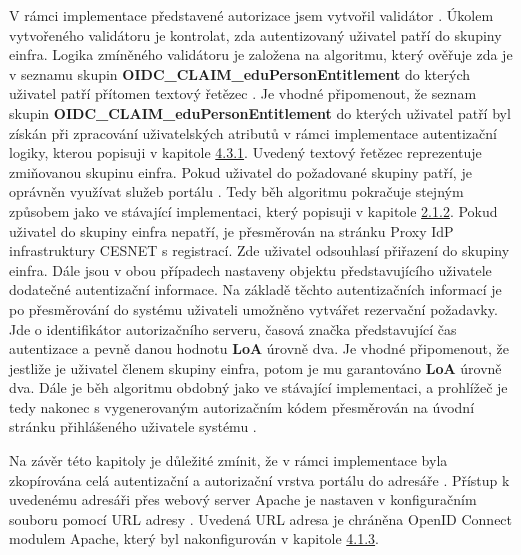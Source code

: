 \documentclass[
  printed, %
  twoside, %
  table,   %
  nolof,     %
  nolot,     %
]{fithesis3}
\begin{document}
V rámci implementace představené autorizace jsem vytvořil validátor . Úkolem vytvořeného validátoru  je kontrolat, zda autentizovaný uživatel patří do skupiny einfra. Logika zmíněného validátoru je založena na algoritmu, který ověřuje zda je v seznamu skupin \textbf{OIDC\_CLAIM\_eduPersonEntitlement} do kterých uživatel patří přítomen textový řetězec . Je vhodné připomenout, že seznam skupin \textbf{OIDC\_CLAIM\_eduPersonEntitlement} do kterých uživatel patří byl získán při zpracování uživatelských atributů v rámci implementace autentizační logiky, kterou popisuji v kapitole \hyperref[ShongoImpl-authn]{4.3.1}. Uvedený textový řetězec reprezentuje zmiňovanou skupinu einfra. Pokud uživatel do požadované skupiny patří, je oprávněn využívat služeb portálu . Tedy běh algoritmu pokračuje stejným způsobem jako ve stávající implementaci, který popisuji v kapitole \hyperref[meetings-old]{2.1.2}. Pokud uživatel do skupiny einfra nepatří, je přesměrován na stránku Proxy IdP infrastruktury CESNET s registrací. Zde uživatel odsouhlasí přiřazení do skupiny einfra. Dále jsou v obou případech nastaveny objektu představujícího uživatele dodatečné autentizační informace. Na základě těchto autentizačních informací je po přesměrování do systému  uživateli umožněno vytvářet rezervační požadavky. Jde o identifikátor autorizačního serveru, časová značka představující čas autentizace a pevně danou hodnotu \textbf{LoA} úrovně dva. Je vhodné připomenout, že jestliže je uživatel členem skupiny einfra, potom je mu garantováno \textbf{LoA} úrovně dva. Dále je běh algoritmu obdobný jako ve stávající implementaci, a prohlížeč je tedy nakonec s vygenerovaným autorizačním kódem přesměrován na úvodní stránku přihlášeného uživatele systému .

\par




Na závěr této kapitoly je důležité zmínit, že v rámci implementace byla zkopírována celá autentizační a autorizační vrstva portálu  do adresáře . Přístup k uvedenému adresáři přes webový server Apache je nastaven v konfiguračním souboru  pomocí URL adresy . Uvedená URL adresa je chráněna OpenID Connect modulem Apache, který byl nakonfigurován v kapitole \hyperref[sec:mod-conf]{4.1.3}.
\end{document}
